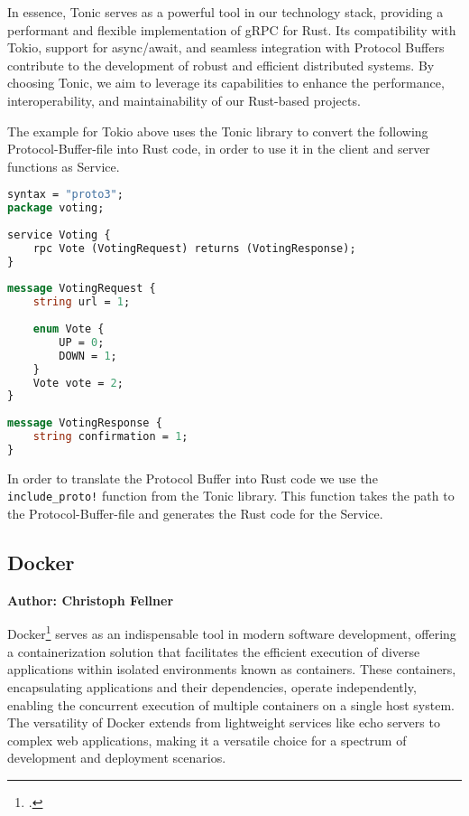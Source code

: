 In essence, Tonic serves as a powerful tool in our technology stack, providing a performant and flexible implementation of gRPC for Rust. Its compatibility with 
Tokio, support for async/await, and seamless integration with Protocol Buffers contribute to the development of robust and efficient distributed systems. By 
choosing Tonic, we aim to leverage its capabilities to enhance the performance, interoperability, and maintainability of our Rust-based projects.\newline

The example for Tokio above uses the Tonic library to convert the following Protocol-Buffer-file into Rust code, in order to use it in the client and server 
functions as Service.

\begin{minipage}{\textwidth}
\begin{lstlisting}[language=ProtoBuf]
syntax = "proto3";
package voting;
        
service Voting {
    rpc Vote (VotingRequest) returns (VotingResponse);
}
        
message VotingRequest {
    string url = 1;
        
    enum Vote {
        UP = 0;
        DOWN = 1;
    }
    Vote vote = 2;    
}
        
message VotingResponse {
    string confirmation = 1;
}
\end{lstlisting}
\end{minipage}

In order to translate the Protocol Buffer into Rust code we use the \verb+include_proto!+ function from the Tonic library. This function takes the path to the 
Protocol-Buffer-file and generates the Rust code for the Service.

\subsection{Docker}
\textbf{Author: Christoph Fellner}

Docker\footcite{docker} serves as an indispensable tool in modern software development, offering a containerization solution that facilitates the efficient 
execution of diverse applications within isolated environments known as containers. These containers, encapsulating applications and their dependencies, operate 
independently, enabling the concurrent execution of multiple containers on a single host system. The versatility of Docker extends from lightweight services 
like echo servers to complex web applications, making it a versatile choice for a spectrum of development and deployment scenarios.\newline

